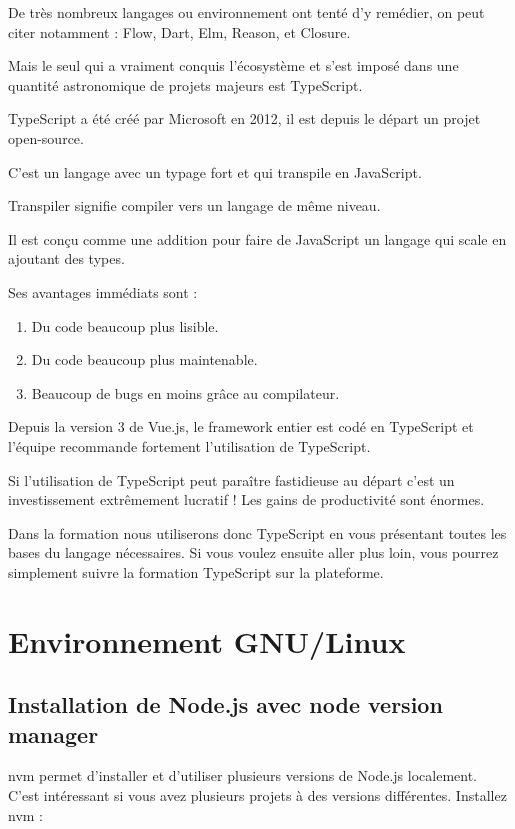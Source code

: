 \documentclass{article}
\begin{document}
De très nombreux langages ou environnement ont tenté d'y remédier, on peut citer notamment : Flow, Dart, Elm, Reason, et Closure.

Mais le seul qui a vraiment conquis l'écosystème et s'est imposé dans une quantité astronomique de projets majeurs est TypeScript.

TypeScript a été créé par Microsoft en 2012, il est depuis le départ un projet open-source.

C'est un langage avec un typage fort et qui transpile en JavaScript.

Transpiler signifie compiler vers un langage de même niveau.

Il est conçu comme une addition pour faire de JavaScript un langage qui scale en ajoutant des types.

Ses avantages immédiats sont :
\begin{enumerate}
\item  Du code beaucoup plus lisible.
\item  Du code beaucoup plus maintenable.
\item  Beaucoup de bugs en moins grâce au compilateur.
\end{enumerate}


Depuis la version 3 de Vue.js, le framework entier est codé en TypeScript et l'équipe recommande fortement l'utilisation de TypeScript.

Si l'utilisation de TypeScript peut paraître fastidieuse au départ c'est un investissement extrêmement lucratif ! Les gains de productivité sont énormes.

Dans la formation nous utiliserons donc TypeScript en vous présentant toutes les bases du langage nécessaires. Si vous voulez ensuite aller plus loin, vous pourrez simplement suivre la formation TypeScript sur la plateforme.


\section{Environnement GNU/Linux}
\subsection{Installation de {\color{monOrange}Node.js} avec {\color{monOrange}node version manager}}
{\color{monOrange}nvm} permet d'installer et d'utiliser plusieurs versions de {\color{monOrange}Node.js} localement. C'est intéressant si vous avez plusieurs projets à des versions différentes. Installez {\color{monOrange}nvm} :
\end{document}
